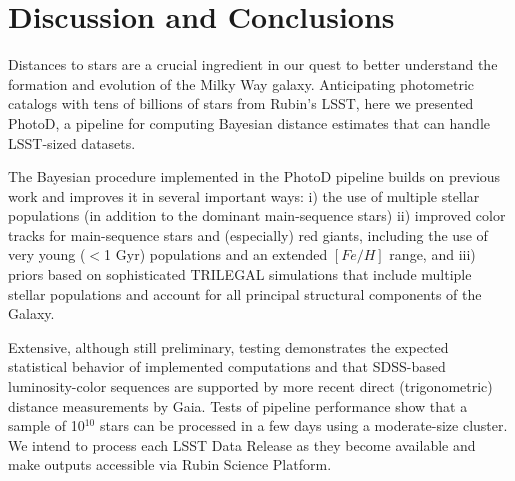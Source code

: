 \section{Discussion and Conclusions \label{sec:disc}}


Distances to stars are a crucial ingredient in our quest to better understand the formation and evolution
of the Milky Way galaxy. Anticipating photometric catalogs with tens of billions of stars from Rubin's LSST,
here we presented PhotoD, a pipeline for computing Bayesian distance estimates that can handle LSST-sized datasets. 

The Bayesian procedure implemented in the PhotoD pipeline builds on previous work \citep[e.g.,][]{2011MNRAS.411..435B, 2012ApJ...757..166B,
2014ApJ...783..114G, green_3d_2019, bailer-jones_estimating_2021} and improves it in several important ways:
i) the use of multiple stellar populations (in addition to the dominant main-sequence stars)  
ii) improved color tracks for main-sequence stars and (especially) red giants, including the use of very young ($<$1 Gyr) populations 
               and an extended $[Fe/H]$ range, and
iii) priors based on sophisticated TRILEGAL simulations \citep{2022ApJS..262...22D} that include multiple stellar populations and
       account for all principal structural components of the Galaxy.

Extensive, although still preliminary, testing demonstrates the expected statistical behavior of implemented computations and
that SDSS-based luminosity-color sequences are supported by more recent direct (trigonometric) distance measurements by Gaia.
Tests of pipeline performance show that a sample of 10$^{10}$ stars can be processed in a few days using a moderate-size cluster.
We intend to process each LSST Data Release as they become available and make outputs accessible via Rubin Science Platform. 


